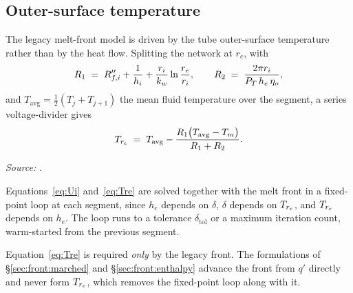 \subsection{Outer-surface temperature}
\label{sec:network:Tre}

The legacy melt-front model is driven by the tube outer-surface temperature
rather than by the heat flow. Splitting the network at $r_{e}$, with
\begin{equation}
  R_{1} \;=\; R''_{f,i} + \frac{1}{h_{i}}
              + \frac{r_{i}}{k_{w}}\ln\frac{r_{e}}{r_{i}},
  \qquad
  R_{2} \;=\; \frac{2\pi r_{i}}{P_{T}\,h_{e}\,\eta_{o}},
\end{equation}
and $T_{\mathrm{avg}}=\tfrac{1}{2}(T_{j}+T_{j+1})$ the mean fluid temperature
over the segment, a series voltage-divider gives
\begin{equation}
  T_{r_{e}} \;=\; T_{\mathrm{avg}}
             - \frac{R_{1}\bigl(T_{\mathrm{avg}}-T_{m}\bigr)}{R_{1}+R_{2}} .
  \label{eq:Tre}
\end{equation}

\emph{Source:} .

Equations~\eqref{eq:Ui} and~\eqref{eq:Tre} are solved together with the melt
front in a fixed-point loop at each segment, since $h_{e}$ depends on $\delta$,
$\delta$ depends on $T_{r_{e}}$, and $T_{r_{e}}$ depends on $h_{e}$. The loop runs to a
tolerance $\delta_{\mathrm{tol}}$ or a maximum iteration count, warm-started
from the previous segment.

Equation~\eqref{eq:Tre} is required \emph{only} by the legacy front. The
formulations of \S\ref{sec:front:marched} and \S\ref{sec:front:enthalpy} advance
the front from $q'$ directly and never form $T_{r_{e}}$, which removes the
fixed-point loop along with it.
